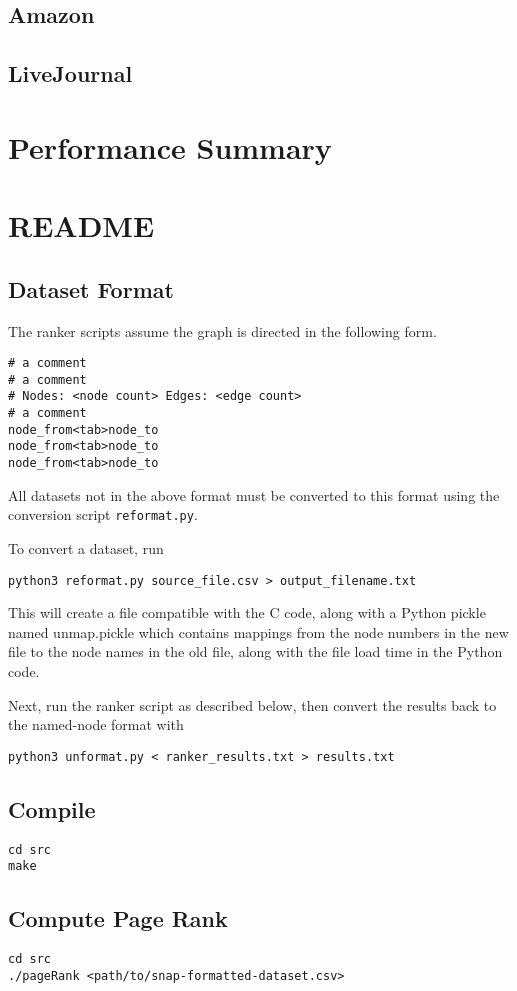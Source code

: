 \documentclass[draft]{report}
\begin{document}
\subsection{Amazon}
\subsection{LiveJournal}

\section{Performance Summary}

\appendix

\section{README}

\subsection{Dataset Format}
The ranker scripts assume the graph is directed in the following form.

\begin{lstlisting}
# a comment
# a comment
# Nodes: <node count> Edges: <edge count>
# a comment
node_from<tab>node_to
node_from<tab>node_to
node_from<tab>node_to
\end{lstlisting}

All datasets not in the above format must be converted to this format using the conversion script \texttt{reformat.py}.

To convert a dataset, run
\begin{lstlisting}
python3 reformat.py source_file.csv > output_filename.txt
\end{lstlisting}

This will create a file compatible with the C code, along with a Python pickle named unmap.pickle which contains mappings from the node numbers in the new file to the node names in the old file, along with the file load time in the Python code.

Next, run the ranker script as described below, then convert the
results back to the named-node format with
\begin{lstlisting}
python3 unformat.py < ranker_results.txt > results.txt
\end{lstlisting}

\subsection{Compile}
\begin{lstlisting}
cd src
make
\end{lstlisting}

\subsection{Compute Page Rank}
\begin{lstlisting}
cd src
./pageRank <path/to/snap-formatted-dataset.csv>
\end{lstlisting}
\end{document}
